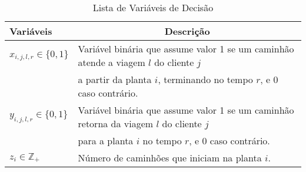 
\begin{table}[ht!]
    \centering
    \begin{tabular}{p{3cm}p{10cm}}
    \toprule
    \textbf{Variáveis} & \multicolumn{1}{c}{\textbf{Descrição}} \\
    \midrule
    $x_{i,j,l,r} \in \{0,1\}$ & Variável binária que assume valor 1 se um caminhão atende a viagem $l$ do cliente $j$ \\
    & a partir da planta $i$, terminando no tempo $r$, e 0 caso contrário. \\
    $y_{i,j,l,r} \in \{0,1\}$ & Variável binária que assume valor 1 se um caminhão retorna da viagem $l$ do cliente $j$ \\
    & para a planta $i$ no tempo $r$, e 0 caso contrário. \\
    $z_i \in \mathbb{Z}_+$ & Número de caminhões que iniciam na planta $i$. \\
    \bottomrule
    \end{tabular}
    \caption{Lista de Variáveis de Decisão}
    \label{tab:variables_decisao}
  \end{table}
  


